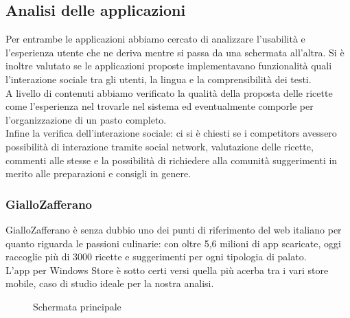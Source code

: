 \subsection{Analisi delle applicazioni}
Per entrambe le applicazioni abbiamo cercato di analizzare l'usabilità e l’esperienza
utente che ne deriva mentre si passa da una schermata all’altra. Si è inoltre valutato se le
applicazioni proposte implementavano funzionalità quali l’interazione sociale tra gli utenti, la
lingua e la comprensibilità dei testi.\\
A livello di contenuti abbiamo verificato la qualità della proposta delle ricette come l’esperienza nel trovarle nel sistema ed eventualmente comporle per l'organizzazione di un pasto completo.\\
Infine la verifica dell'interazione sociale: ci si è chiesti se i competitors avessero
possibilità di interazione tramite social network, valutazione delle ricette, commenti alle stesse e
la possibilità di richiedere alla comunità suggerimenti in merito alle preparazioni e consigli in
genere.
\subsubsection{GialloZafferano}

GialloZafferano è senza dubbio uno dei punti di riferimento del web italiano per quanto riguarda le passioni culinarie: con oltre 5,6 milioni di app scaricate, oggi raccoglie più di 3000 ricette e suggerimenti per ogni tipologia di palato.\\
L'app per Windows Store è sotto certi versi quella più acerba tra i vari store mobile, caso di studio ideale per la nostra analisi.\\

\begin{figure}[h]
  \caption{Schermata principale}
  \label{fig:key}
\end{figure}


